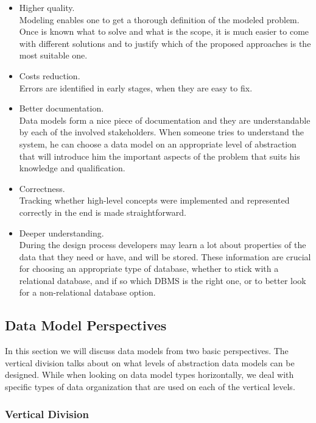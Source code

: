 \begin{itemize}
	\item Higher quality.\\ Modeling enables one to get a thorough definition of the modeled problem. Once is known what to solve and what is the scope, it is much easier to come with different solutions and to justify which of the proposed approaches is the most suitable one.
	
	\item Costs reduction.\\ Errors are identified in early stages, when they are easy to fix.
	
	\item Better documentation.\\ Data models form a nice piece of documentation and they are understandable by each of the involved stakeholders. When someone tries to understand the system, he can choose a data model on an appropriate level of abstraction that will introduce him the important aspects of the problem that suits his knowledge and qualification.
	
	\item Correctness.\\ Tracking whether high-level concepts were implemented and represented correctly in the end is made straightforward.
	
	\item Deeper understanding.\\ During the design process developers may learn a lot about properties of the data that they need or have, and will be stored. These information are crucial for choosing an appropriate type of database, whether to stick with a relational database, and if so which DBMS is the right one, or to better look for a non-relational database option.
\end{itemize}

\subsection{Data Model Perspectives}

In this section we will discuss data models from two basic perspectives. 
The vertical division talks about on what levels of abstraction data models can be designed. 
While when looking on data model types horizontally, we deal with specific types of data organization that are used on each of the vertical levels.

\subsubsection{Vertical Division}

